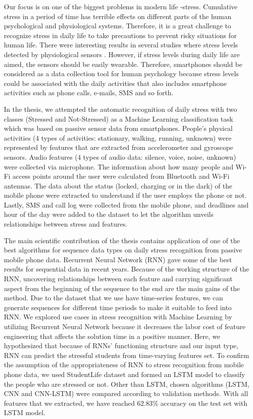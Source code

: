 \documentclass[12pt,oneandhalf,chaparabic,lfm,phd,eng,oneside,pntc]{gsufbe}
\begin{document}
Our focus is on one of the biggest problems in modern life -stress. Cumulative stress in a period of time has terrible effects on different parts of the human psychological and physiological systems. Therefore, it is a great challenge to recognize stress in daily life to take precautions to prevent risky situations for human life. There were interesting results in several studies where stress levels detected by physiological sensors \cite{huang2016stressclick, zhai2006stress, giannakakis2017stress, hosseini2010emotional}. However, if stress levels during daily life are aimed, the sensors should be easily wearable. Therefore, smartphones should be considered as a data collection tool for human psychology because stress levels could be associated with the daily activities that also includes smartphone activities such as phone calls, e-mails, SMS and so forth. 

In the thesis, we attempted the automatic recognition of daily stress with two classes (Stressed and Not-Stressed) as a Machine Learning classification task which was based on passive sensor data from smartphones. People's physical activities (4 types of activities: stationary, walking, running, unknown) were represented by features that are extracted from accelerometer and gyroscope sensors. Audio features (4 types of audio data: silence, voice, noise, unknown) were collected via microphone. The information about how many people and Wi-Fi access points around the user were calculated from Bluetooth and Wi-Fi antennas. The data about the status (locked, charging or in the dark) of the mobile phone were extracted to understand if the user employs the phone or not. Lastly, SMS and call log were collected from the mobile phone, and deadlines and hour of the day were added to the dataset to let the algorithm unveils relationships between stress and features. 

The main scientific contribution of the thesis contains application of one of the best algorithms for sequence data types on daily stress recognition from passive mobile phone data. Recurrent Neural Network (RNN) gave some of the best results for sequential data in recent years. Because of the working structure of the RNN, uncovering relationships between each feature and carrying significant aspect from the beginning of the sequence to the end are the main gains of the method. Due to the dataset that we use have time-series features, we can generate sequences for different time periods to make it suitable to feed into RNN. We explored use cases in stress recognition with Machine Learning by utilizing Recurrent Neural Network because it decreases the labor cost of feature engineering that affects the solution time in a positive manner. Here, we hypothesized that because of RNNs’ functioning structure and our input type, RNN can predict the stressful students from time-varying features set. To confirm the assumption of the appropriateness of RNN to stress recognition from mobile phone data, we used StudentLife dataset and formed an LSTM model to classify the people who are stressed or not. Other than LSTM, chosen algorithms (LSTM, CNN and CNN-LSTM) were compared according to validation methods. With all features that we extracted, we have reached 62.83\% accuracy on the test set with LSTM model. 
\end{document}
